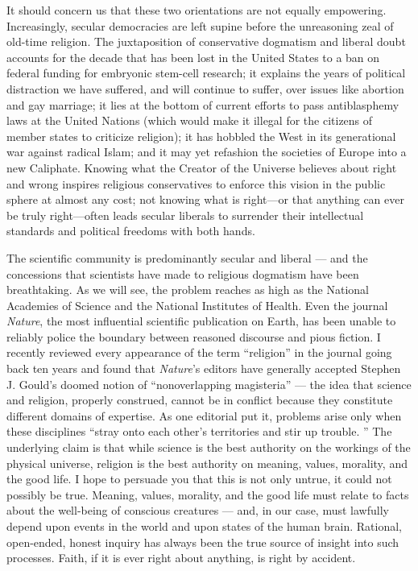 \documentclass[a4paper,12pt]{extbook}
\begin{document}
It should concern us that these two orientations are not equally empowering. 
Increasingly, secular democracies are left supine before the unreasoning zeal of old-time religion. 
The juxtaposition of conservative dogmatism and liberal doubt accounts for the decade that has been lost in the United States to a ban on federal funding for embryonic stem-cell research;
it explains the years of political distraction we have suffered, and will continue to suffer, over issues like abortion and gay marriage;
it lies at the bottom of current efforts to pass antiblasphemy laws at the United Nations (which would make it illegal for the citizens of member states to criticize religion);
it has hobbled the West in its generational war against radical Islam;
and it may yet refashion the societies of Europe into a new Caliphate. 
Knowing what the Creator of the Universe believes about right and wrong inspires religious conservatives to enforce this vision in the public sphere at almost any cost; not knowing what is right—or that anything can ever be truly right—often leads secular liberals to surrender their intellectual standards and political freedoms with both hands. 

The scientific community is predominantly secular and liberal --- and the concessions that scientists have made to religious dogmatism have been breathtaking. 
As we will see, the problem reaches as high as the National Academies of Science and the National Institutes of Health. 
Even the journal \textit{Nature}, the most influential scientific publication on Earth, has been unable to reliably police the boundary between reasoned discourse and pious fiction. 
I recently reviewed every appearance of the term ``religion'' in the journal going back ten years and found that \textit{Nature}’s editors have generally accepted Stephen J. Gould’s doomed notion of ``nonoverlapping magisteria'' --- the idea that science and religion, properly construed, cannot be in conflict because they constitute different domains of expertise. 
As one editorial put it, problems arise only when these disciplines ``stray onto each other’s territories and stir up trouble. ''
The underlying claim is that while science is the best authority on the workings of the physical universe, religion is the best authority on meaning, values, morality, and the good life. 
I hope to persuade you that this is not only untrue, it could not possibly be true. 
Meaning, values, morality, and the good life must relate to facts about the well-being of conscious creatures --- and, in our case, must lawfully depend upon events in the world and upon states of the human brain. 
Rational, open-ended, honest inquiry has always been the true source of insight into such processes. 
Faith, if it is ever right about anything, is right by accident. 
\end{document}
